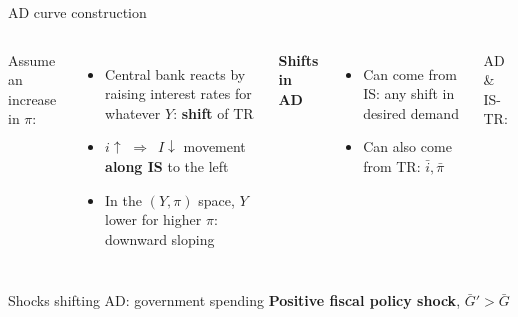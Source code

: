 \documentclass{beamer}
\newcommand{\tb}[1]{{\color{blue}{\textbf{#1}}}}
\newcommand{\rarr}{$\Rightarrow$\ }
\begin{document}
\begin{frame}{AD curve construction}

\begin{columns}
Assume an increase in $\pi$:
\begin{itemize}
  \item Central bank reacts by raising interest rates for whatever $Y$: \textbf{shift} of TR 
\item $i\uparrow$ \rarr $I \downarrow$ movement \textbf{along IS} to the left
\item In the $(Y, \pi)$ space, $Y$ lower for higher $\pi$: downward sloping \tb{AD}
\end{itemize}
\vfill
\textbf{Shifts in AD}
\begin{itemize}
  \item Can come from IS: any shift in desired demand
  \item Can also come from TR: $\bar i, \bar{\pi}$
\end{itemize}
\vspace{7cm}
 AD \& IS-TR:
%
	
\end{columns} 	 

\end{frame}


\begin{frame}{Shocks shifting AD: government spending}
  \vspace{-3cm}
 \small \textbf{Positive fiscal policy shock}, $\bar{G}'> \bar{G}$
 \vfill
\end{frame}
\end{document}
